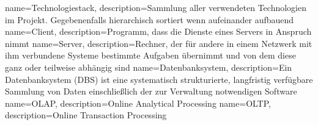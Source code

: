 {
  name=Technologiestack,
  description={Sammlung aller verwendeten Technologien im Projekt. Gegebenenfalls hierarchisch sortiert wenn aufeinander aufbauend}
}
{
  name=Client,
  description={Programm, dass die Dienste eines Servers in Anspruch nimmt}
}
{
  name=Server,
  description={Rechner, der für andere in einem Netzwerk mit ihm verbundene Systeme bestimmte Aufgaben übernimmt und von dem diese ganz oder teilweise abhängig sind}
}
{
  name=Datenbanksystem,
  description={Ein Datenbanksystem (DBS) ist eine systematisch strukturierte, langfristig verfügbare Sammlung von Daten einschließlich der zur Verwaltung notwendigen Software}
}
{
  name=OLAP,
  description={Online Analytical Processing}
}
{
  name=OLTP,
  description={Online Transaction Processing}
}


\renewcommand*{\glossaryname}{\section{\glossarName}}

\glsaddall
\printglossaries

